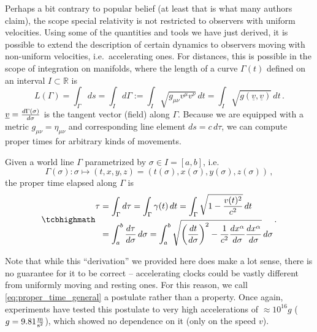 Perhaps a bit contrary to popular belief (at least that is what many authors claim), the scope special relativity is not restricted to observers with uniform velocities. Using some of the quantities and tools we have just derived, it is possible to extend the description of certain dynamics to observers moving with non-uniform velocities, i.e.~accelerating ones. For distances, this is possible in the scope of integration on manifolds, where the length of a curve $\Gamma(t)$ defined on an interval $I \subset \mathbb{R}$ is
\begin{equation}
	L(\Gamma) = \int_\Gamma ds = \int_I d\Gamma := \int_I \sqrt{g_{\mu \nu} v^\mu v^\nu} \, dt = \int_I \sqrt{g(\underline{v}, \underline{v})} \, dt \, .
\end{equation}
$\underline{v} = \dv{\Gamma(\sigma)}{\sigma}$ is the tangent vector (field) along $\Gamma$. Because we are equipped with a metric $g_{\mu \nu} = \eta_{\mu \nu}$ and corresponding line element $ds = c \, d\tau$, we can compute proper times for arbitrary kinds of movements.
\begin{post}
	Given a world line $\Gamma$ parametrized by $\sigma \in I = [a, b]$, i.e.
	\begin{equation*}
		\Gamma(\sigma): \sigma \mapsto (t, x, y, z) = (t(\sigma), x(\sigma), y(\sigma), z(\sigma)) \, ,
	\end{equation*}
	the proper time elapsed along $\Gamma$ is
	\begin{equation}\label{eq:proper_time_general}
		\eqbox{
		\begin{split}
		\tau &= \int_\Gamma d\tau = \int_\Gamma \gamma(t) \, dt = \int_\Gamma \sqrt{1 - \frac{v(t)^2}{c^2}} \, dt
		\\
		&= \int_a^b \dv{\tau}{\sigma} \, d\sigma = \int_a^b \sqrt{\qty(\dv{t}{\sigma})^2 - \frac{1}{c^2} \dv{x^\alpha}{\sigma} \dv{x^\alpha}{\sigma}} \, d\sigma
		\end{split}
		} \, .
	\end{equation}
\end{post}
Note that while this \enquote{derivation} we provided here does make a lot sense, there is no guarantee for it to be correct -- accelerating clocks could be vastly different from uniformly moving and resting ones. For this reason, we call \eqref{eq:proper_time_general} a postulate rather than a property. Once again, experiments have tested this postulate to very high accelerations of $\approx 10^{16} g$ ($g = 9.81 \frac{\metre}{\second^2}$), which showed no dependence on it (only on the speed $v$).

